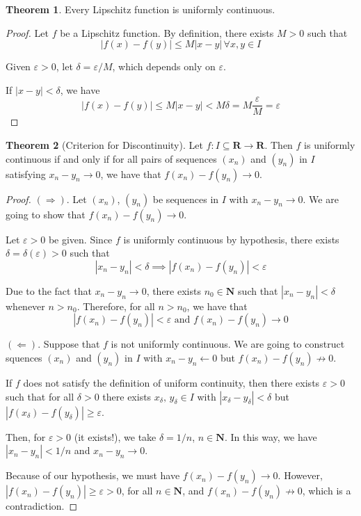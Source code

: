 \documentclass[12pt,a4paper]{article}
\theoremstyle{definition}
\newtheorem{theorem}{Theorem}[section]
\begin{document}
\begin{theorem}
	Every Lipschitz function is uniformly continuous. 
\end{theorem}

\begin{proof}
	Let $f$ be a Lipschitz function. By definition, there exists $M > 0$ such that
	\[
		|f(x) - f(y) | \leq M |x-y| \, \forall x,y \in I
	\]
	
	Given $\varepsilon > 0$, let $\delta = \varepsilon/M$, which depends only on $\varepsilon$.
	
	If $|x-y| < \delta$, we have
	\[
		|f(x) - f(y) | \leq M |x-y| < M \delta = M \frac{\varepsilon}{M} = \varepsilon
	\]
\end{proof}

\begin{theorem}[Criterion for Discontinuity]
	Let $f : I \subseteq \textbf{R} \longrightarrow \textbf{R}$. Then $f$ is uniformly continuous if and only if for all pairs of sequences $(x_n)$ and $(y_n)$ in $I$ satisfying $x_n - y_n \longrightarrow 0$, we have that $f(x_n) - f(y_n) \longrightarrow 0$.
\end{theorem}

\begin{proof}
	$(\Rightarrow).$ Let $(x_n)$, $(y_n)$ be sequences in $I$ with $x_n - y_n \longrightarrow 0$. We are going to show that $f(x_n) - f(y_n) \longrightarrow 0$.
	
	Let $\varepsilon > 0$ be given. Since $f$ is uniformly continuous by hypothesis, there exists $\delta = \delta(\varepsilon) > 0$ such that
	\[
		|x_n - y_n| < \delta \implies |f(x_n) - f(y_n)| < \varepsilon
	\]
	
	Due to the fact that $x_n - y_n \longrightarrow 0$, there exists $n_0 \in \textbf{N}$ such that $|x_n - y_n| < \delta$ whenever $n > n_0$. Therefore, for all $n > n_0$, we have that 
	\[
		|f(x_n) - f(y_n)| < \varepsilon \text{ and } f(x_n) - f(y_n) \longrightarrow 0 
	\]
	
	$(\Leftarrow).$ Suppose that $f$ is not uniformly continuous. We are going to construct squences $(x_n)$ and $(y_n)$ in $I$ with $x_n - y_n \longleftarrow 0$ but $f(x_n) - f(y_n) \not\longrightarrow 0$.
	
	If $f$ does not satisfy the definition of uniform continuity, then there exists $\varepsilon > 0$ such that for all $\delta > 0$ there exists $x_\delta, \, y_\delta \in I$ with $| x_\delta - y_\delta | < \delta$ but $| f(x_\delta ) - f(y_\delta )| \geq \varepsilon$.
	
	Then, for $\varepsilon > 0$ (it exists!), we take $\delta = 1/n$, $n \in \textbf{N}$. In this way, we have $ |x_n - y_n| < 1/n$ and $x_n - y_n \longrightarrow 0$.
	
	Because of our hypothesis, we must have $f(x_n) - f(y_n) \longrightarrow 0$. However, $|f(x_n) - f(y_n)| \geq \varepsilon > 0$, for all $n \in \textbf{N}$, and $f(x_n) - f(y_n) \not\longrightarrow 0$, which is a contradiction.
\end{proof}
\end{document}
